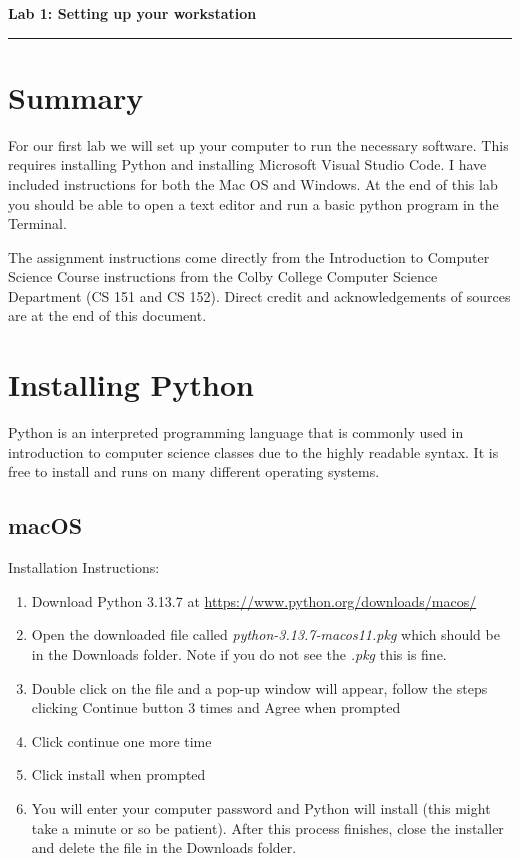 \documentclass[12pt]{article}
\begin{document}
\begin{center}
  {\Large {\bf Lab 1: Setting up your workstation}}
  
\end{center}

\vspace{5pt}
\hrule
\vspace{5pt}

\section{Summary}
For our first lab we will set up your computer to run the necessary software. 
This requires installing Python and installing Microsoft Visual Studio Code.
I have included instructions for both the Mac OS and Windows. 
At the end of this lab you should be able to open a text editor and run a basic python program in the Terminal.

The assignment instructions come directly from the Introduction to Computer Science Course instructions from the Colby College Computer Science Department (CS 151 and CS 152).
Direct credit and acknowledgements of sources are at the end of this document. 

\section{Installing Python}
Python is an interpreted programming language that is commonly used in introduction to computer science classes due to the highly readable syntax.
It is free to install and runs on many different operating systems. 

\subsection{macOS}
Installation Instructions: 
\begin{enumerate}
\item Download Python 3.13.7 at \url{https://www.python.org/downloads/macos/}
\item Open the downloaded file called \textit{python-3.13.7-macos11.pkg} which should be in the Downloads folder. Note if you do not see the \textit{.pkg} this is fine. 
\item Double click on the file and a pop-up window will appear, follow the steps clicking Continue button 3 times and Agree when prompted
\item Click continue one more time
\item Click install when prompted
\item You will enter your computer password and Python will install (this might take a minute or so be patient). After this process finishes, close the installer and delete the file in the Downloads folder.
\end{enumerate}
\end{document}
